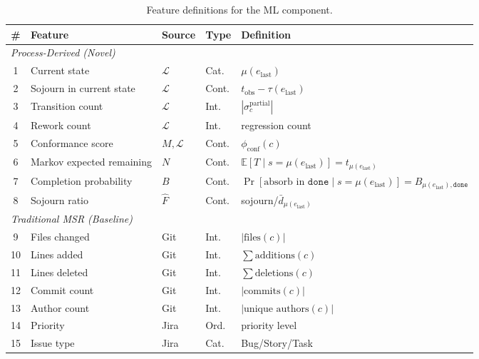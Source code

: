 \begin{table}[htbp]
\centering
\caption{Feature definitions for the ML component.}
\label{tab:features}
\small
\begin{tabular}{cllll}
\toprule
\textbf{\#} & \textbf{Feature} & \textbf{Source} & \textbf{Type} & \textbf{Definition} \\
\midrule
\multicolumn{5}{l}{\textit{Process-Derived (Novel)}} \\
\midrule
1 & Current state                & $\mathcal{L}$ & Cat.   & $\mu(e_{\text{last}})$ \\
2 & Sojourn in current state     & $\mathcal{L}$ & Cont.  & $t_{\text{obs}} - \tau(e_{\text{last}})$ \\
3 & Transition count             & $\mathcal{L}$ & Int.   & $|\sigma_c^{\text{partial}}|$ \\
4 & Rework count                 & $\mathcal{L}$ & Int.   & regression count \\
5 & Conformance score            & $M, \mathcal{L}$ & Cont. & $\phi_{\text{conf}}(c)$ \\
6 & Markov expected remaining    & $N$           & Cont.  & $\mathbb{E}[T \mid s = \mu(e_{\text{last}})] = t_{\mu(e_{\text{last}})}$ \\
7 & Completion probability       & $B$           & Cont.  & $\Pr[\text{absorb in } \texttt{done} \mid s = \mu(e_{\text{last}})] = B_{\mu(e_{\text{last}}), \texttt{done}}$ \\
8 & Sojourn ratio                & $\hat{F}$     & Cont.  & sojourn/$\bar{d}_{\mu(e_{\text{last}})}$ \\
\midrule
\multicolumn{5}{l}{\textit{Traditional MSR (Baseline)}} \\
\midrule
9  & Files changed     & Git  & Int.    & $|\text{files}(c)|$ \\
10 & Lines added       & Git  & Int.    & $\sum \text{additions}(c)$ \\
11 & Lines deleted     & Git  & Int.    & $\sum \text{deletions}(c)$ \\
12 & Commit count      & Git  & Int.    & $|\text{commits}(c)|$ \\
13 & Author count      & Git  & Int.    & $|\text{unique authors}(c)|$ \\
14 & Priority          & Jira & Ord.    & priority level \\
15 & Issue type        & Jira & Cat.    & Bug/Story/Task \\
\bottomrule
\end{tabular}
\end{table}


